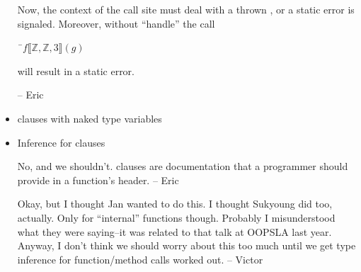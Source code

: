 \begin{itemize}
Now, the context of the call site must deal with a thrown
, or
a static error is signaled. Moreover, without  ``handle'' the call

\begin{Fortress}
{\tt~}\pushtabs\=\+\( f\llbracket\mathbb{Z},\mathbb{Z},3\rrbracket(g)\)\-\\\poptabs
\end{Fortress}

will result in a static error.

-- Eric

\item {} clauses with naked type variables

\item Inference for  clauses

No, and we shouldn't.  clauses are documentation that a
programmer should provide in a function's header.  -- Eric

Okay, but I thought Jan wanted to do this.  I thought Sukyoung did too,
actually.  Only for ``internal'' functions though.  Probably I
misunderstood what they were saying--it was related to that talk at OOPSLA
last year.  Anyway, I don't think we should worry about this too much until
we get type inference for function/method calls worked out. -- Victor

\end{itemize}

